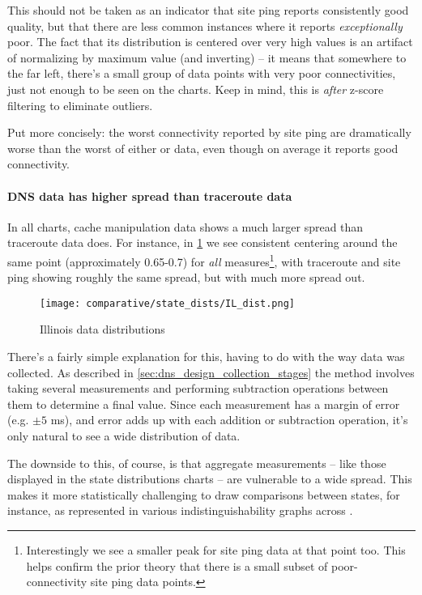 This should not be taken as an indicator that site ping reports consistently good quality, but that there are less common instances where it reports \textit{exceptionally} poor. The fact that its distribution is centered over very high values is an artifact of normalizing by maximum value (and inverting) -- it means that somewhere to the far left, there's a small group of data points with very poor connectivities, just not enough to be seen on the \kde charts. Keep in mind, this is \textit{after} z-score filtering to eliminate outliers.

Put more concisely: the worst connectivity reported by site ping are dramatically worse than the worst of either \dns or \caida data, even though on average it reports good connectivity.

\paragraph{DNS data has higher spread than traceroute data} In all charts, \dns cache manipulation data shows a much larger spread than traceroute data does. For instance, in \cref{fig:comparative_il_dist} we see consistent centering around the same point (approximately 0.65-0.7) for \textit{all} measures\footnote{Interestingly we see a smaller peak for site ping data at that point too. This helps confirm the prior theory that there is a small subset of poor-connectivity site ping data points.}, with traceroute and site ping showing roughly the same spread, but with \dns much more spread out.

\begin{figure}[hb]
    \centering
    \texttt{[image: comparative/state\_dists/IL\_dist.png]}
    \caption{Illinois data distributions}
    \label{fig:comparative_il_dist}
\end{figure}

There's a fairly simple explanation for this, having to do with the way data was collected. As described in \cref{sec:dns_design_collection_stages} the \dns method involves taking several measurements and performing subtraction operations between them to determine a final value. Since each measurement has a margin of error (e.g. $\pm5$ ms), and error adds up with each addition or subtraction operation, it's only natural to see a wide distribution of data.

The downside to this, of course, is that aggregate measurements -- like those displayed in the state distributions charts -- are vulnerable to a wide spread. This makes it more statistically challenging to draw comparisons between states, for instance, as represented in various indistinguishability graphs across .

